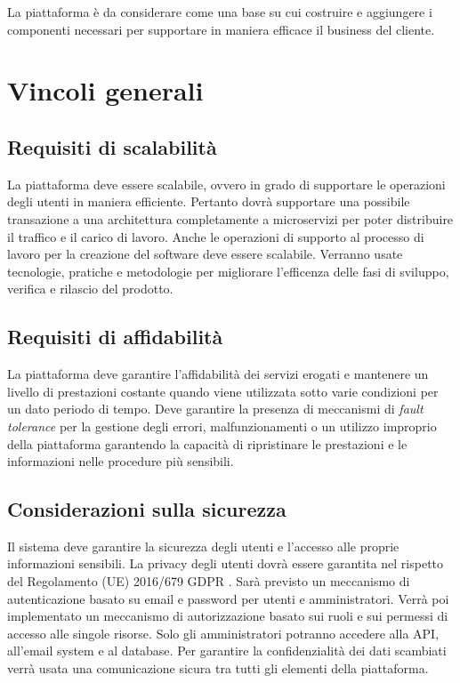 La piattaforma è da considerare come una base su cui costruire e aggiungere i componenti necessari per supportare in maniera efficace il business del
cliente.

\section{Vincoli generali}
\subsection{Requisiti di scalabilità}
La piattaforma deve essere scalabile, ovvero in grado di supportare le operazioni degli utenti
in maniera efficiente.
Pertanto dovrà supportare una possibile transazione a una architettura completamente a microservizi per poter distribuire il traffico e
il carico di lavoro.
Anche le operazioni di supporto al processo di lavoro per la creazione del software deve essere scalabile.
Verranno usate tecnologie, pratiche e metodologie per migliorare l'efficenza delle fasi di sviluppo, verifica e rilascio del prodotto.

\subsection{Requisiti di affidabilità}
La piattaforma deve garantire l'affidabilità dei servizi erogati e mantenere un livello di prestazioni
costante quando viene utilizzata sotto varie condizioni per un dato periodo di tempo.
Deve garantire la presenza di meccanismi di \textit{fault tolerance} per la gestione degli errori, malfunzionamenti o un utilizzo improprio della piattaforma
garantendo la capacità di ripristinare le prestazioni e le informazioni nelle procedure più sensibili.

\subsection{Considerazioni sulla sicurezza}
Il sistema deve garantire la sicurezza degli utenti e l’accesso alle proprie informazioni sensibili.
La privacy degli utenti dovrà essere garantita nel rispetto del Regolamento (UE) 2016/679 GDPR \cite{gdpr}.
Sarà previsto un meccanismo di autenticazione basato su email e password per utenti e amministratori.
Verrà poi implementato un meccanismo di autorizzazione basato sui ruoli e sui permessi di accesso alle singole risorse.
Solo gli amministratori potranno accedere alla API, all’email system e al database.
Per garantire la confidenzialità dei dati scambiati verrà usata una comunicazione sicura tra tutti gli elementi della piattaforma.

